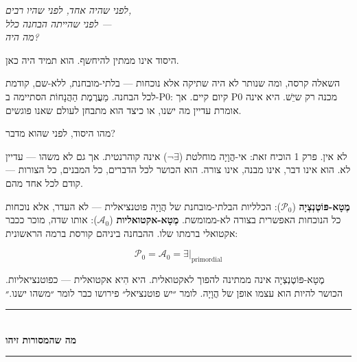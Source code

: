 \documentclass[10pt, openany, oneside]{book}
\renewcommand{\normalsize}{\fontsize{10}{13}\selectfont}
\begin{document}
\begin{center}
    \textit{%
    לפני שהיה אחד, לפני שהיו רבים,\\
    לפני שהייתה הבחנה כלל —\\
    מה היה?}
\end{center}

\vspace{2em}


\noindent היסוד אינו ממתין להיחשף. הוא תמיד היה כאן.

השאלה קרסה, ומה שנותר לא היה שתיקה אלא נוכחות — בלתי-מובחנת, ללא-שם, קודמת לכל הבחנה. מַעֲרֶמֶת הַהֲנָחוֹת הסתיימה ב-P0: קיום קיים. אך P0 מכנה רק שיֵשׁ. היא אינה אומרת עדיין מה ישנו, או כיצד הוא מתבחן לעולם שאנו פוגשים.

מהו היסוד, לפני שהוא מדבר?

לא אין. פרק 1 הוכיח זאת: אי-הֲוָיָה מוחלטת ($\neg\exists$) אינה קוהרנטית. אך גם לא משהו — עדיין לא. הוא אינו דבר, אינו מבנה, אינו צורה. הוא הכושר לכל הדברים, כל המבנים, כל הצורות — קודם לכל אחד מהם.

\textbf{מֶטָא-פּוֹטֶנְצְיָה} ($\mathcal{P}_0$): הכלליות הבלתי-מובחנת של הֲוָיָה פוטנציאלית — לא העדר, אלא נוכחות כל הנוכחות האפשרית בצורה לא-ממומשת. \textbf{מֶטָא-אקטואליות} ($\mathcal{A}_0$): אותו שדה, מוכר ככבר אקטואלי ברמתו שלו. ההבחנה ביניהם קורסת ברמה הראשונית:

$$\mathcal{P}_0 = \mathcal{A}_0 = \exists|_{\text{primordial}}$$

מֶטָא-פּוֹטֶנְצְיָה אינה ממתינה להפוך לאקטואלית. היא הִיא אקטואלית — כפוטנציאליות. הכושר להיות הוא עצמו אופן של הֲוָיָה. לומר ״יש פוטנציאל״ פירושו כבר לומר ״משהו ישנו.״

\vspace{1.5em}


\begin{center}
    \rule{0.3\textwidth}{0.4pt}\\[0.5em]
    {\normalsize\bfseries\textsc{מה שהמסורות זיהו}}\\[0.3em]
    \rule{0.3\textwidth}{0.4pt}
\end{center}

\vspace{1em}
\end{document}
